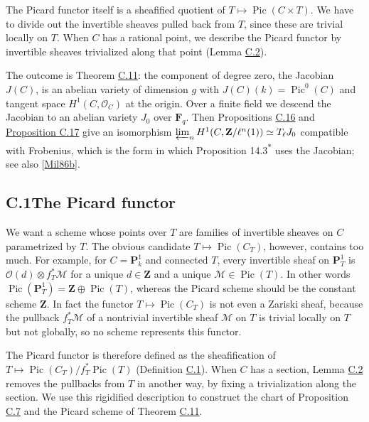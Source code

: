 \documentclass[11pt]{article}
\newcommand{\bpout}[1]{#1\textsuperscript{\hyperlink{bp-outside}{\ensuremath{\ast}}}}
\begin{document}
The Picard functor itself is a sheafified quotient of \(T\mapsto\operatorname{Pic}(C\times T)\). We have to divide out the invertible sheaves pulled back from \(T\), since these are trivial locally on \(T\). When \(C\) has a rational point, we describe the Picard functor by invertible sheaves trivialized along that point (Lemma \hyperref[bp125]{C.2}).

The outcome is Theorem \hyperref[bp154]{C.11}: the component of degree zero, the Jacobian \(J(C)\), is an abelian variety of dimension \(g\) with \(J(C)(k)=\operatorname{Pic}^0(C)\) and tangent space \(H^1(C,\mathcal O_C)\) at the origin. Over a finite field we descend the Jacobian to an abelian variety \(J_0\) over \(\mathbf F_q\). Then Propositions \hyperref[bp167]{C.16} and \hyperref[bp170]{Proposition C.17} give an isomorphism \(\varprojlim_nH^1(C,\mathbf Z/\ell^n(1))\simeq T_\ell J_0\) compatible with Frobenius, which is the form in which Proposition \bpout{14.3} uses the Jacobian; see also [\hyperref[bp350]{Mil86b}].

\subsection*{\texorpdfstring{C.1\quad The Picard functor}{C.1 The Picard functor}}
\label{bp121}%
\label{bp122}%
We want a scheme whose points over \(T\) are families of invertible sheaves on \(C\) parametrized by \(T\). The obvious candidate \(T\mapsto\operatorname{Pic}(C_T)\), however, contains too much. For example, for \(C=\mathbf P^1_k\) and connected \(T\), every invertible sheaf on \(\mathbf P^1_T\) is \(\mathcal O(d)\otimes f_T^*\mathcal M\) for a unique \(d\in\mathbf Z\) and a unique \(\mathcal M\in\operatorname{Pic}(T)\). In other words \(\operatorname{Pic}(\mathbf P^1_T)=\mathbf Z\oplus\operatorname{Pic}(T)\), whereas the Picard scheme should be the constant scheme \(\mathbf Z\). In fact the functor \(T\mapsto\operatorname{Pic}(C_T)\) is not even a Zariski sheaf, because the pullback \(f_T^*\mathcal M\) of a nontrivial invertible sheaf \(\mathcal M\) on \(T\) is trivial locally on \(T\) but not globally, so no scheme represents this functor.

The Picard functor is therefore defined as the sheafification of \(T\mapsto\operatorname{Pic}(C_T)/f_T^*\operatorname{Pic}(T)\) (Definition \hyperref[bp123]{C.1}). When \(C\) has a section, Lemma \hyperref[bp125]{C.2} removes the pullbacks from \(T\) in another way, by fixing a trivialization along the section. We use this rigidified description to construct the chart of Proposition \hyperref[bp142]{C.7} and the Picard scheme of Theorem \hyperref[bp154]{C.11}.
\end{document}
